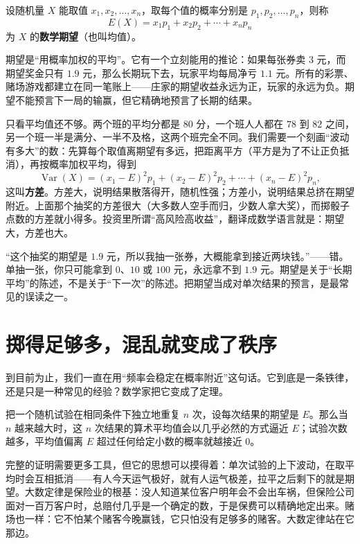 \begin{dingyi}
设随机量 $X$ 能取值 $x_1,x_2,\dots,x_n$，取每个值的概率分别是 $p_1,p_2,\dots,p_n$，则称
\[
E(X)=x_1p_1+x_2p_2+\cdots+x_np_n
\]
为 $X$ 的\textbf{数学期望}（也叫均值）。
\end{dingyi}

期望是“用概率加权的平均”。它有一个立刻能用的推论：如果每张券卖 $3$ 元，而期望奖金只有 $1.9$ 元，那么长期玩下去，玩家平均每局净亏 $1.1$ 元。所有的彩票、赌场游戏都建立在同一笔账上——庄家的期望收益永远为正，玩家的永远为负。期望不能预言下一局的输赢，但它精确地预言了长期的结果。

只看平均值还不够。两个班的平均分都是 $80$ 分，一个班人人都在 $78$ 到 $82$ 之间，另一个班一半是满分、一半不及格，这两个班完全不同。我们需要一个刻画“波动有多大”的数：先算每个取值离期望有多远，把距离平方（平方是为了不让正负抵消），再按概率加权平均，得到
\[
\operatorname{Var}(X)=(x_1-E)^2p_1+(x_2-E)^2p_2+\cdots+(x_n-E)^2p_n,
\]
这叫\textbf{方差}。方差大，说明结果散落得开，随机性强；方差小，说明结果总挤在期望附近。上面那个抽奖的方差很大（大多数人空手而归，少数人拿大奖），而掷骰子点数的方差就小得多。投资里所谓“高风险高收益”，翻译成数学语言就是：期望大，方差也大。

\begin{fanli}
“这个抽奖的期望是 $1.9$ 元，所以我抽一张券，大概能拿到接近两块钱。”——错。单抽一张，你只可能拿到 $0$、$10$ 或 $100$ 元，永远拿不到 $1.9$ 元。期望是关于“长期平均”的陈述，不是关于“下一次”的陈述。把期望当成对单次结果的预言，是最常见的误读之一。
\end{fanli}

\section{掷得足够多，混乱就变成了秩序}

到目前为止，我们一直在用“频率会稳定在概率附近”这句话。它到底是一条铁律，还是只是一种常见的经验？数学家把它变成了定理。

\begin{dingli}
把一个随机试验在相同条件下独立地重复 $n$ 次，设每次结果的期望是 $E$。那么当 $n$ 越来越大时，这 $n$ 次结果的算术平均值会以几乎必然的方式逼近 $E$；试验次数越多，平均值偏离 $E$ 超过任何给定小数的概率就越接近 $0$。
\end{dingli}

完整的证明需要更多工具，但它的思想可以摸得着：单次试验的上下波动，在取平均时会互相抵消——有人今天运气极好，就有人运气极差，拉平之后剩下的就是期望。大数定律是保险业的根基：没人知道某位客户明年会不会出车祸，但保险公司面对一百万客户时，总赔付几乎是一个确定的数，于是保费可以精确地定出来。赌场也一样：它不怕某个赌客今晚赢钱，它只怕没有足够多的赌客。大数定律站在它那边。

